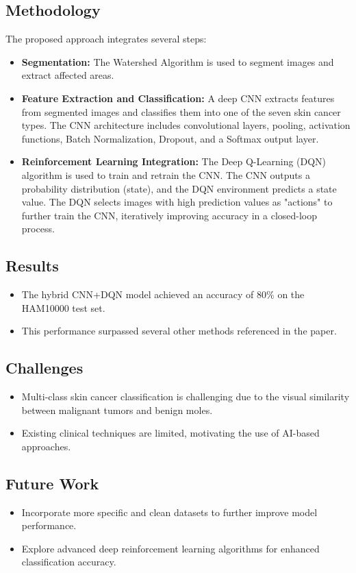 \subsection*{Methodology}
The proposed approach integrates several steps:
\begin{itemize}
    \item \textbf{Segmentation:} The Watershed Algorithm is used to segment images and extract affected areas.
    \item \textbf{Feature Extraction and Classification:} A deep CNN extracts features from segmented images and classifies them into one of the seven skin cancer types. The CNN architecture includes convolutional layers, pooling, activation functions, Batch Normalization, Dropout, and a Softmax output layer.
    \item \textbf{Reinforcement Learning Integration:} The Deep Q-Learning (DQN) algorithm is used to train and retrain the CNN. The CNN outputs a probability distribution (state), and the DQN environment predicts a state value. The DQN selects images with high prediction values as "actions" to further train the CNN, iteratively improving accuracy in a closed-loop process.
\end{itemize}

\subsection*{Results}
\begin{itemize}
    \item The hybrid CNN+DQN model achieved an accuracy of 80\% on the HAM10000 test set.
    \item This performance surpassed several other methods referenced in the paper.
\end{itemize}

\subsection*{Challenges}
\begin{itemize}
    \item Multi-class skin cancer classification is challenging due to the visual similarity between malignant tumors and benign moles.
    \item Existing clinical techniques are limited, motivating the use of AI-based approaches.
\end{itemize}

\subsection*{Future Work}
\begin{itemize}
    \item Incorporate more specific and clean datasets to further improve model performance.
    \item Explore advanced deep reinforcement learning algorithms for enhanced classification accuracy.
\end{itemize}

